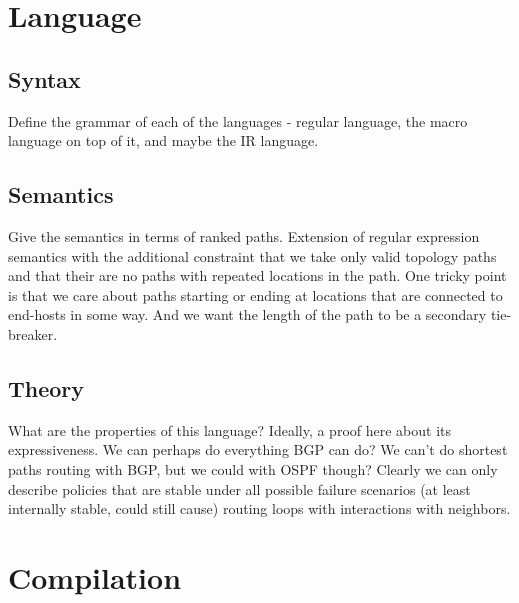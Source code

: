 \documentclass{paper}
\begin{document}
\section{Language} 

\subsection{Syntax}
Define the grammar of each of the languages - regular language, the macro language on top of it, and maybe the IR language.

\subsection{Semantics} 
Give the semantics in terms of ranked paths.
Extension of regular expression semantics with the 
additional constraint that we take only valid topology paths and that their are no paths with 
repeated locations in the path. One tricky point is that we care about paths starting or ending at locations that are 
connected to end-hosts in some way. And we want the length of the path to be a secondary tie-breaker.

\subsection{Theory}
What are the properties of this language? Ideally, a proof here about its expressiveness. We can perhaps do everything 
BGP can do? We can't do shortest paths routing with BGP, but we could with OSPF though? Clearly we can only describe 
policies that are stable under all possible failure scenarios (at least internally stable, could still cause) routing 
loops with interactions with neighbors.


\section{Compilation}
\end{document}
